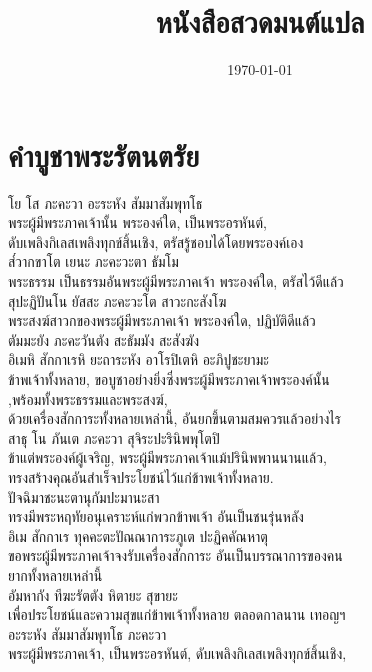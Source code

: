 \documentclass{article}
\title{หนังสือสวดมนต์แปล}
\date{\today}
\begin{document}
\pagecolor{lightyellow}
\maketitle
\newpage
\tableofcontents

\pagebreak
\section{คำบูชาพระรัตนตรัย}
โย โส ภะคะวา อะระหัง สัมมาสัมพุทโธ\\
\indent พระผู้มีพระภาคเจ้านั้น พระองค์ใด, เป็นพระอรหันต์, \\
ดับเพลิงกิเลสเพลิงทุกข์สิ้นเชิง, ตรัสรู้ชอบได้โดยพระองค์เอง\\
ส๎วากขาโต เยนะ ภะคะวะตา ธัมโม \\
\indent พระธรรม เป็นธรรมอันพระผู้มีพระภาคเจ้า พระองค์ใด, ตรัสไว้ดีแล้ว\\
สุปะฏิปันโน ยัสสะ ภะคะวะโต สาวะกะสังโฆ\\
\indent พระสงฆ์สาวกของพระผู้มีพระภาคเจ้า พระองค์ใด, ปฏิบัติดีแล้ว\\
ตัมมะยัง ภะคะวันตัง สะธัมมัง สะสังฆัง\\
อิเมหิ สักกาเรหิ ยะถาระหัง อาโรปิเตหิ อะภิปูชะยามะ\\
\indent ข้าพเจ้าทั้งหลาย, ขอบูชาอย่างยิ่งซึ่งพระผู้มีพระภาคเจ้าพระองค์นั้น\\
,พร้อมทั้งพระธรรมและพระสงฆ์,\\
ด้วยเครื่องสักการะทั้งหลายเหล่านี้, อันยกขึ้นตามสมควรแล้วอย่างไร\\
สาธุ โน ภันเต ภะคะวา สุจิระปะรินิพพุโตปิ\\
\indent ข้าแต่พระองค์ผู้เจริญ, พระผู้มีพระภาคเจ้าแม้ปรินิพพานนานแล้ว,\\
ทรงสร้างคุณอันสำเร็จประโยชน์ไว้แก่ข้าพเจ้าทั้งหลาย.\\
ปัจฉิมาชะนะตานุกัมปะมานะสา\\
\indent ทรงมีพระหฤทัยอนุเคราะห์แก่พวกข้าพเจ้า อันเป็นชนรุ่นหลัง\\
อิเม สักกาเร ทุคคะตะปัณณาการะภูเต ปะฏิคคัณหาตุ\\
\indent ขอพระผู้มีพระภาคเจ้าจงรับเครื่องสักการะ อันเป็นบรรณาการของคน\\
ยากทั้งหลายเหล่านี้\\
อัมหากัง ทีฆะรัตตัง หิตายะ สุขายะ\\
\indent เพื่อประโยชน์และความสุขแก่ข้าพเจ้าทั้งหลาย ตลอดกาลนาน เทอญฯ\\
อะระหัง สัมมาสัมพุทโธ ภะคะวา\\
\indent พระผู้มีพระภาคเจ้า, เป็นพระอรหันต์, ดับเพลิงกิเลสเพลิงทุกข์สิ้นเชิง,\\
\end{document}
